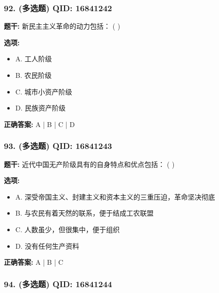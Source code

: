\documentclass[12pt,UTF8]{ctexart}
\begin{document}
\subsubsection*{92. (多选题) \small QID: 16841242}

\textbf{题干:}
新民主主义革命的动力包括： ( )

\textbf{选项:}
\begin{itemize}[leftmargin=*]

  \item A. 工人阶级

  \item B. 农民阶级

  \item C. 城市小资产阶级

  \item D. 民族资产阶级

\end{itemize}

\textbf{正确答案:}
A | B | C | D

\vspace{0.3em}\hrulefill\vspace{0.7em}

\subsubsection*{93. (多选题) \small QID: 16841243}

\textbf{题干:}
近代中国无产阶级具有的自身特点和优点包括： ( )

\textbf{选项:}
\begin{itemize}[leftmargin=*]

  \item A. 深受帝国主义、封建主义和资本主义的三重压迫，革命坚决彻底

  \item B. 与农民有着天然的联系，便于结成工农联盟

  \item C. 人数虽少，但很集中，便于组织

  \item D. 没有任何生产资料

\end{itemize}

\textbf{正确答案:}
A | B | C

\vspace{0.3em}\hrulefill\vspace{0.7em}

\subsubsection*{94. (多选题) \small QID: 16841244}
\end{document}
